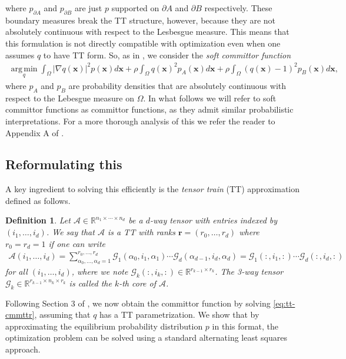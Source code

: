 \documentclass[11pt]{amsart}
\newtheorem{definition}{Definition}
\newcommand{\RR}{\mathbb{R}}
\begin{document}
where $p_{\partial A}$ and $p_{\partial B}$ are just $p$ supported on $\partial A$ and $\partial B$ respectively. These boundary measures break the TT structure, however, because they are not absolutely continuous with respect to the Lesbesgue measure. This means that this formulation is not directly compatible with optimization even when one assumes $q$ to have TT form. So, as in \cite{committor}, we consider the \emph{soft committor function}
\begin{align}\label{eq:tt-cmmttr}
    \operatorname*{arg\,min}_q\int_\Omega|\nabla q(\boldsymbol{x})|^2p(\boldsymbol{x})d\boldsymbol{x}+\rho\int_\Omega q(\boldsymbol{x})^2p_A(\boldsymbol{x})d\boldsymbol{x}+\rho\int_\Omega (q(\boldsymbol{x})-1)^2p_B(\boldsymbol{x})d\boldsymbol{x},
\end{align}
where $p_A$ and $p_B$ are probability densities that are absolutely continuous with respect to the Lebesgue measure on $\Omega$. In what follows we will refer to soft committor functions as committor functions, as they admit similar probabilistic interpretations. For a more thorough analysis of this we refer the reader to Appendix A of \cite{committor}.

\subsection{Reformulating this}
A key ingredient to solving this efficiently is the \emph{tensor train} (TT) approximation defined as follows.
\begin{definition}
    Let $\mathcal{A}\in\RR^{n_1\times\cdots\times n_d}$ be a $d$-way tensor with entries indexed by $(i_1,\ldots,i_d)$. We say that $\mathcal{A}$ is a TT with ranks $\boldsymbol{r}=(r_0,\ldots,r_d)$ where $r_0=r_d=1$ if one can write
    \begin{align}
        \mathcal{A}(i_1,\ldots,i_d)=\sum_{\alpha_0,\ldots,\alpha_d=1}^{r_0,\ldots,r_d}\mathcal{G}_1(\alpha_0,i_1,\alpha_1)\cdots\mathcal{G}_d(\alpha_{d-1},i_d,\alpha_d)=\mathcal{G}_1(:,i_1,:)\cdots\mathcal{G}_d(:,i_d,:)
    \end{align}
    for all $(i_1,\ldots,i_d)$, where we note $\mathcal{G}_k(:,i_k,:)\in\RR^{r_{k-1}\times r_k}$. The 3-way tensor $\mathcal{G}_k\in\RR^{r_{k-1}\times n_k\times r_k}$ is called the $k$-th core of $\mathcal{A}$.
\end{definition}

Following Section 3 of \cite{committor}, we now obtain the committor function by solving \cref{eq:tt-cmmttr}, assuming that $q$ has a TT parametrization. We show that by approximating the equilibrium probability distribution $p$ in this format, the optimization problem can be solved using a standard alternating least squares approach.
\end{document}
